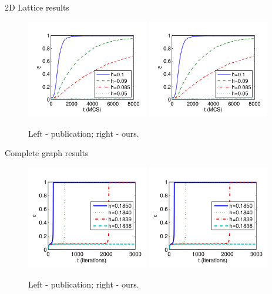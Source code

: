 \documentclass[10pt]{beamer}
\begin{document}
\begin{frame}{2D Lattice results}
	\begin{figure}
		\includegraphics[width=0.475\textwidth]{../resources/images/fig7-left.png}
		\hfill
		\includegraphics[width=0.475\textwidth]{../resources/images/fig7-left.png}
		\caption{Left - publication; right - ours.}
	\end{figure}
\end{frame}

\begin{frame}{Complete graph results}
	\begin{figure}
		\includegraphics[width=0.475\textwidth]{../resources/images/fig10-left.png}
		\hfill
		\includegraphics[width=0.475\textwidth]{../resources/images/fig10-left.png}
		\caption{Left - publication; right - ours.}
	\end{figure}
\end{frame}
\end{document}
